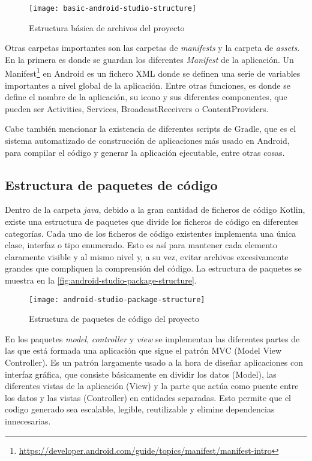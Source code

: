 \begin{figure}[H]
	\centering
	\texttt{[image: basic-android-studio-structure]}
	\caption{Estructura básica de archivos del proyecto}
	\label{fig:basic-android-studio-structure}
\end{figure}

Otras carpetas importantes son las carpetas de \textit{manifests} y la carpeta de \textit{assets}. En la primera es donde se guardan los diferentes \textit{Manifest} de la aplicación. Un Manifest\footnote{\url{https://developer.android.com/guide/topics/manifest/manifest-intro}} en Android es un fichero XML donde se definen una serie de variables importantes a nivel global de la aplicación. Entre otras funciones, es donde se define el nombre de la aplicación, su icono y sus diferentes componentes, que pueden ser Activities, Services, BroadcastReceivers o ContentProviders.

Cabe también mencionar la existencia de diferentes scripts de Gradle, que es el sistema automatizado de construcción de aplicaciones más usado en Android, para compilar el código y generar la aplicación ejecutable, entre otras cosas.

\subsection{Estructura de paquetes de código}

Dentro de la carpeta \textit{java}, debido a la gran cantidad de ficheros de código Kotlin, existe una estructura de paquetes que divide los ficheros de código en diferentes categorías. Cada uno de los ficheros de código existentes implementa una única clase, interfaz o tipo enumerado. Esto es así para mantener cada elemento claramente visible y al mismo nivel y, a su vez, evitar archivos excesivamente grandes que compliquen la comprensión del código. La estructura de paquetes se muestra en la \autoref{fig:android-studio-package-structure}.

\begin{figure}[H]
	\centering
	\texttt{[image: android-studio-package-structure]}
	\caption{Estructura de paquetes de código del proyecto}
	\label{fig:android-studio-package-structure}
\end{figure}

En los paquetes \textit{model}, \textit{controller} y \textit{view} se implementan las diferentes partes de las que está formada una aplicación que sigue el patrón MVC (Model View Controller). Es un patrón largamente usado a la hora de diseñar aplicaciones con interfaz gráfica, que consiste básicamente en dividir los datos (Model), las diferentes vistas de la aplicación (View) y la parte que actúa como puente entre los datos y las vistas (Controller) en entidades separadas. Esto permite que el codigo generado sea escalable, legible, reutilizable y elimine dependencias innecesarias. 

